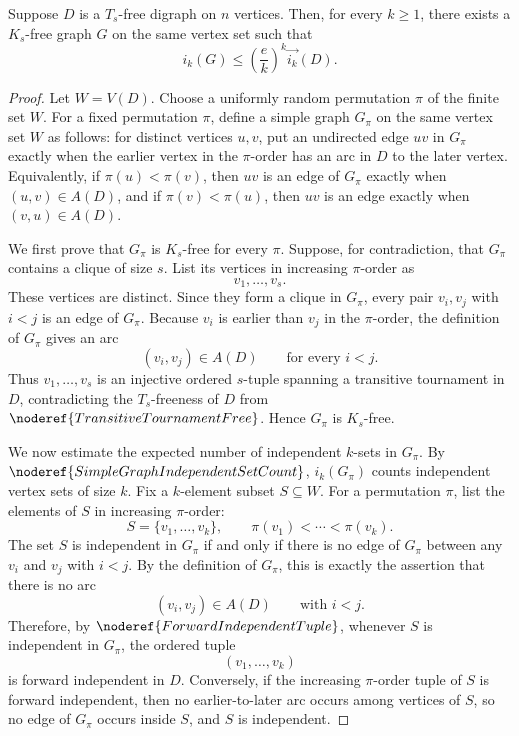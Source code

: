 \begin{lemma}
Suppose \(D\) is a \(T_s\)-free digraph on \(n\) vertices. Then, for every \(k\ge 1\), there exists a \(K_s\)-free graph \(G\) on the same vertex set such that
\[
  i_k(G)\le \left(\frac e k\right)^k\overrightarrow{i_k}(D).
\]
\end{lemma}
\begin{proof}
Let \(W=V(D)\). Choose a uniformly random permutation \(\pi\) of the finite set \(W\). For a fixed permutation \(\pi\), define a simple graph \(G_\pi\) on the same vertex set \(W\) as follows: for distinct vertices \(u,v\), put an undirected edge \(uv\) in \(G_\pi\) exactly when the earlier vertex in the \(\pi\)-order has an arc in \(D\) to the later vertex. Equivalently, if \(\pi(u)<\pi(v)\), then \(uv\) is an edge of \(G_\pi\) exactly when \((u,v)\in A(D)\), and if \(\pi(v)<\pi(u)\), then \(uv\) is an edge exactly when \((v,u)\in A(D)\).

We first prove that \(G_\pi\) is \(K_s\)-free for every \(\pi\). Suppose, for contradiction, that \(G_\pi\) contains a clique of size \(s\). List its vertices in increasing \(\pi\)-order as
\[
  v_1,\ldots,v_s.
\]
These vertices are distinct. Since they form a clique in \(G_\pi\), every pair \(v_i,v_j\) with \(i<j\) is an edge of \(G_\pi\). Because \(v_i\) is earlier than \(v_j\) in the \(\pi\)-order, the definition of \(G_\pi\) gives an arc
\[
  (v_i,v_j)\in A(D)
  \qquad\text{for every }i<j.
\]
Thus \(v_1,\ldots,v_s\) is an injective ordered \(s\)-tuple spanning a transitive tournament in \(D\), contradicting the \(T_s\)-freeness of \(D\) from \(\noderef{TransitiveTournamentFree}\). Hence \(G_\pi\) is \(K_s\)-free.

We now estimate the expected number of independent \(k\)-sets in \(G_\pi\). By \(\noderef{SimpleGraphIndependentSetCount}\), \(i_k(G_\pi)\) counts independent vertex sets of size \(k\). Fix a \(k\)-element subset \(S\subseteq W\). For a permutation \(\pi\), list the elements of \(S\) in increasing \(\pi\)-order:
\[
  S=\{v_1,\ldots,v_k\},\qquad
  \pi(v_1)<\cdots<\pi(v_k).
\]
The set \(S\) is independent in \(G_\pi\) if and only if there is no edge of \(G_\pi\) between any \(v_i\) and \(v_j\) with \(i<j\). By the definition of \(G_\pi\), this is exactly the assertion that there is no arc
\[
  (v_i,v_j)\in A(D)
  \qquad\text{with }i<j.
\]
Therefore, by \(\noderef{ForwardIndependentTuple}\), whenever \(S\) is independent in \(G_\pi\), the ordered tuple
\[
  (v_1,\ldots,v_k)
\]
is forward independent in \(D\). Conversely, if the increasing \(\pi\)-order tuple of \(S\) is forward independent, then no earlier-to-later arc occurs among vertices of \(S\), so no edge of \(G_\pi\) occurs inside \(S\), and \(S\) is independent.


\end{proof}
